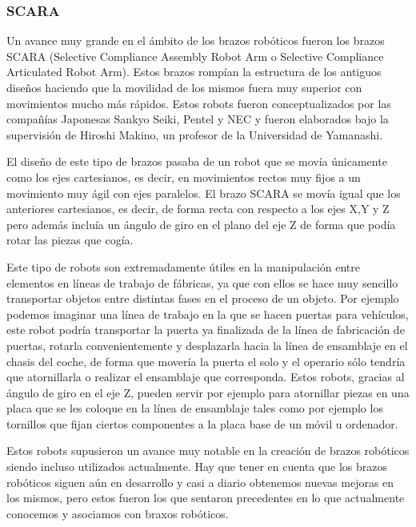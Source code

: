 \subsubsection{SCARA}
Un avance muy grande en el ámbito de los brazos robóticos fueron los brazos SCARA (Selective Compliance Assembly Robot Arm o Selective Compliance Articulated Robot Arm). Estos brazos rompían la estructura de los antiguos diseños haciendo que la movilidad de los mismos fuera muy superior con movimientos mucho más rápidos. Estos robots fueron conceptualizados por las compañías Japonesas Sankyo Seiki, Pentel y NEC y fueron elaborados bajo la supervisión de Hiroshi Makino, un profesor de la Universidad de Yamanashi.

El diseño de este tipo de brazos pasaba de un robot que se movía únicamente como los ejes cartesianos, es decir, en movimientos rectos muy fijos a un movimiento muy ágil con ejes paralelos. El brazo SCARA se movía igual que los anteriores cartesianos, es decir, de forma recta con respecto a los ejes X,Y y Z pero además incluía un ángulo de giro en el plano del eje Z de forma que podía rotar las piezas que cogía.

Este tipo de robots son extremadamente útiles en la manipulación entre elementos en líneas de trabajo de fábricas, ya que con ellos se hace muy sencillo transportar objetos entre distintas fases en el proceso de un objeto. Por ejemplo podemos imaginar una línea de trabajo en la que se hacen puertas para vehículos, este robot podría transportar la puerta ya finalizada de la línea de fabricación de puertas, rotarla convenientemente y desplazarla hacia la línea de ensamblaje en el chasis del coche, de forma que movería la puerta el solo y el operario sólo tendría que atornillarla o realizar el ensamblaje que corresponda. Estos robots, gracias al ángulo de giro en el eje Z, pueden servir por ejemplo para atornillar piezas en una placa que se les coloque en la línea de ensamblaje tales como por ejemplo los tornillos que fijan ciertos componentes a la placa base de un móvil u ordenador.

Estos robots supusieron un avance muy notable en la creación de brazos robóticos siendo incluso utilizados actualmente. Hay que tener en cuenta que los brazos robóticos siguen aún en desarrollo y casi a diario obtenemos nuevas mejoras en los mismos, pero estos fueron los que sentaron precedentes en lo que actualmente conocemos y asociamos con braxos robóticos.
